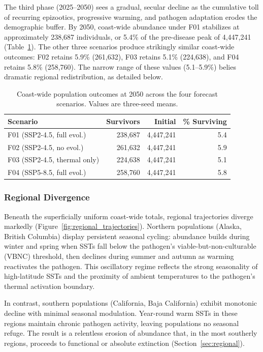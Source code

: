 The third phase (2025--2050) sees a gradual, secular decline as the
cumulative toll of recurring epizootics, progressive warming, and
pathogen adaptation erodes the demographic buffer.  By 2050, coast-wide
abundance under F01 stabilizes at approximately 238,687 individuals, or
5.4\% of the pre-disease peak of 4,447,241 (Table~\ref{tab:overall}).
The other three scenarios produce strikingly similar coast-wide outcomes:
F02 retains 5.9\% (261,632), F03 retains 5.1\% (224,638), and F04
retains 5.8\% (258,760).  The narrow range of these values
(5.1--5.9\%) belies dramatic regional redistribution, as detailed below.

\begin{table}[htbp]
\centering
\caption{Coast-wide population outcomes at 2050 across the four
forecast scenarios.  Values are three-seed means.}
\label{tab:overall}
\smallskip
\begin{tabular}{lrrr}
\toprule
\textbf{Scenario} & \textbf{Survivors} & \textbf{Initial} &
  \textbf{\% Surviving} \\
\midrule
F01 (SSP2-4.5, full evol.)       & 238,687 & 4,447,241 & 5.4 \\
F02 (SSP2-4.5, no evol.)         & 261,632 & 4,447,241 & 5.9 \\
F03 (SSP2-4.5, thermal only)     & 224,638 & 4,447,241 & 5.1 \\
F04 (SSP5-8.5, full evol.)       & 258,760 & 4,447,241 & 5.8 \\
\bottomrule
\end{tabular}
\end{table}

\subsubsection{Regional Divergence}

Beneath the superficially uniform coast-wide totals, regional
trajectories diverge markedly
(Figure~\ref{fig:regional_trajectories}).  Northern populations
(Alaska, British Columbia) display persistent seasonal cycling:
abundance builds during winter and spring when SSTs fall below the
pathogen's viable-but-non-culturable (VBNC) threshold, then declines
during summer and autumn as warming reactivates the pathogen.  This
oscillatory regime reflects the strong seasonality of high-latitude
SSTs and the proximity of ambient temperatures to the pathogen's
thermal activation boundary.

In contrast, southern populations (California, Baja California) exhibit
monotonic decline with minimal seasonal modulation.  Year-round warm
SSTs in these regions maintain chronic pathogen activity, leaving
populations no seasonal refuge.  The result is a relentless erosion of
abundance that, in the most southerly regions, proceeds to functional
or absolute extinction (Section~\ref{sec:regional}).

